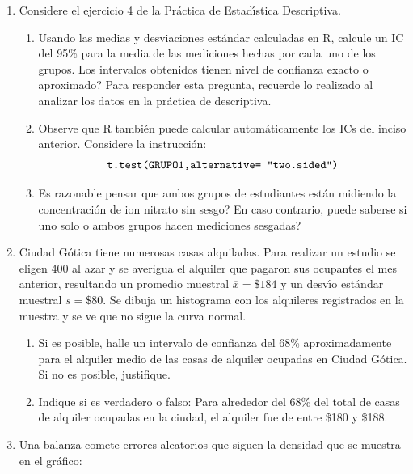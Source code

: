 \documentclass[11pt,a4paper,twoside]{article}%
\begin{document}
\begin{enumerate}

\item Considere el ejercicio 4 de la Pr\'{a}ctica de Estad\'{\i}stica Descriptiva.

\begin{enumerate}
\item Usando las medias y desviaciones est\'{a}ndar calculadas en R,
calcule un IC del 95\% para la media de las mediciones hechas por cada uno de
los grupos. \textquestiondown Los intervalos obtenidos tienen nivel de
confianza exacto o aproximado? Para responder esta pregunta,
recuerde lo realizado al analizar los datos en la pr\'{a}ctica de descriptiva.

\item Observe que R tambi\'{e}n puede calcular
autom\'{a}ticamente los ICs del inciso anterior. Considere la instrucci\'{o}n:%
\[
\text{\texttt{t.test(GRUPO1,alternative= "two.sided")}}%
\]

\item \textquestiondown Es razonable pensar que ambos grupos de estudiantes
est\'{a}n midiendo la concentraci\'{o}n de ion nitrato sin sesgo? En caso
contrario, \textquestiondown puede saberse si uno solo o ambos grupos hacen
mediciones sesgadas?
\end{enumerate}

\item Ciudad G\'{o}tica tiene numerosas casas alquiladas. Para realizar un
estudio se eligen 400 al azar y se averigua el alquiler que pagaron sus
ocupantes el mes anterior, resultando un promedio muestral $\overline
{x}=\$184$ y un desv\'{\i}o est\'{a}ndar muestral $s=\$80$. Se dibuja un
histograma con los alquileres registrados en la muestra y se ve que no sigue
la curva normal.

\begin{enumerate}
\item Si es posible, halle un intervalo de confianza del 68\% aproximadamente
para el alquiler medio de las casas de alquiler ocupadas en Ciudad G\'{o}tica.
Si no es posible, justifique.

\item Indique si es verdadero o falso: Para alrededor del 68\% del total de
casas de alquiler ocupadas en la ciudad, el alquiler fue de entre \$180 y \$188.
\end{enumerate}

\item Una balanza comete errores aleatorios que siguen la densidad que se
muestra en el gr\'{a}fico:%


\end{enumerate}
\end{document}

